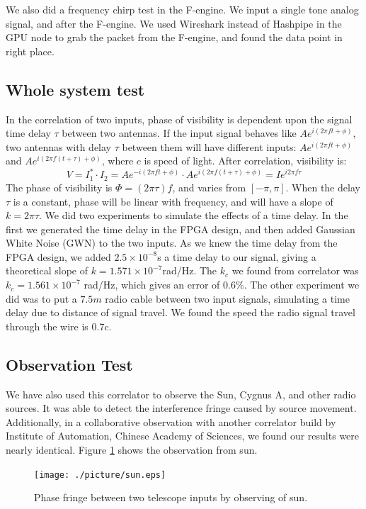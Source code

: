 \documentclass{ws-jai}
\begin{document}
We also did a frequency chirp test in the F-engine. We input a single tone analog signal, and after the F-engine. We used Wireshark instead of Hashpipe in the GPU node to grab the packet from the F-engine, and found the data point in right place.
\subsection{Whole system test}
In the correlation of two inputs, phase of visibility is dependent upon the signal time delay $\tau$ between two antennas. If the input signal behaves like $Ae^{i(2\pi ft + \phi)}$, two antennas with delay $\tau$ between them will have different inputs: $Ae^{i(2\pi ft + \phi)}$ and  $Ae^{i(2\pi f(t+\tau) + \phi)}$, where $c$ is speed of light. After correlation, visibility is:
\begin{equation}
V = I_1^*\cdot I_2=Ae^{-i(2\pi ft + \phi)} \cdot Ae^{i(2\pi f(t+\tau) + \phi)} = I e^{i2\pi f\tau}
\end{equation}
The phase of visibility is $\Phi =(2\pi \tau )f$, and varies from $[-\pi, \pi]$.  When the delay $\tau$ is a constant, phase will be linear with frequency, and will have a slope of $k =2\pi \tau $. We did two experiments to simulate the effects of a time delay. In the first we generated the time delay in the FPGA design, and then added Gaussian White Noise (GWN) to the two inputs. As we knew the time delay from the FPGA design, we added $2.5\times 10^{-8}$s a time delay to our signal, giving a theoretical slope of  $k=1.571\times 10^{-7}$rad/Hz. The $k_c$ we found from correlator was $k_c = 1.561 \times 10^{-7}$ rad/Hz, which gives an error of $0.6\%$.
The other experiment we did was to put a $7.5m$ radio cable between two input signals, simulating a time delay due to distance of signal travel. We found the speed the radio signal travel through the wire is 0.7c.
\subsection{Observation Test}
We have also used this correlator to observe the Sun, Cygnus A, and other radio sources. It was able to detect the interference fringe caused by source movement. Additionally, in a collaborative observation with another correlator build by Institute of Automation, Chinese Academy of Sciences, we found our results were nearly identical. Figure \ref{fig:sun} shows the observation from sun.
\begin{figure}[t]
 \centering
 \texttt{[image: ./picture/sun.eps]}
\caption{Phase fringe between two telescope inputs by observing of sun.\label{fig:sun}}
\end{figure}
\end{document}
